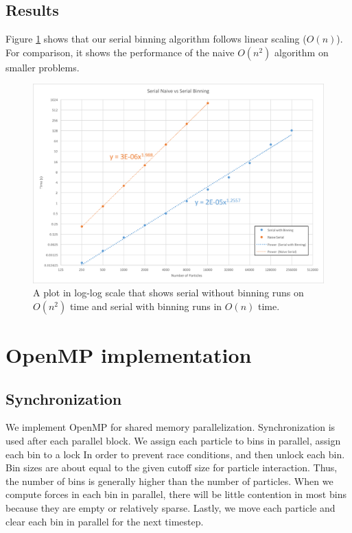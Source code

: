 \documentclass[12pt]{article}
\begin{document}
\subsection{Results}
Figure \ref{fig:serial-on} shows that our serial binning algorithm follows linear scaling ($O(n)$). For comparison, it shows the performance of the naive $O(n^2)$ algorithm on smaller problems.

\begin{figure}
 \includegraphics[width=\textwidth]{graphs/serial_binning_vs_naive.png}
  \caption{A plot in log-log scale that shows serial without binning runs on $O(n^2)$ time and serial with binning runs in $O(n)$ time.}
  \label{fig:serial-on}
\end{figure}

\section{OpenMP implementation}

\subsection{Synchronization}

We implement OpenMP for shared memory parallelization. Synchronization is used after each parallel block. We assign each particle to bins in parallel, assign each bin to a lock In order to prevent race conditions, and then unlock each bin. Bin sizes are about equal to the given cutoff size for particle interaction. Thus, the number of bins is generally higher than the number of particles. When we compute forces in each bin in parallel, there will be little contention in most bins because they are empty or relatively sparse. Lastly, we move each particle and clear each bin in parallel for the next timestep. 
\end{document}
